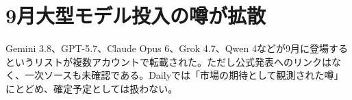 \section{9月大型モデル投入の噂が拡散}
Gemini 3.8、GPT-5.7、Claude Opus 6、Grok 4.7、Qwen 4などが9月に登場するというリストが複数アカウントで転載された。ただし公式発表へのリンクはなく、一次ソースも未確認である。Dailyでは「市場の期待として観測された噂」にとどめ、確定予定としては扱わない。
